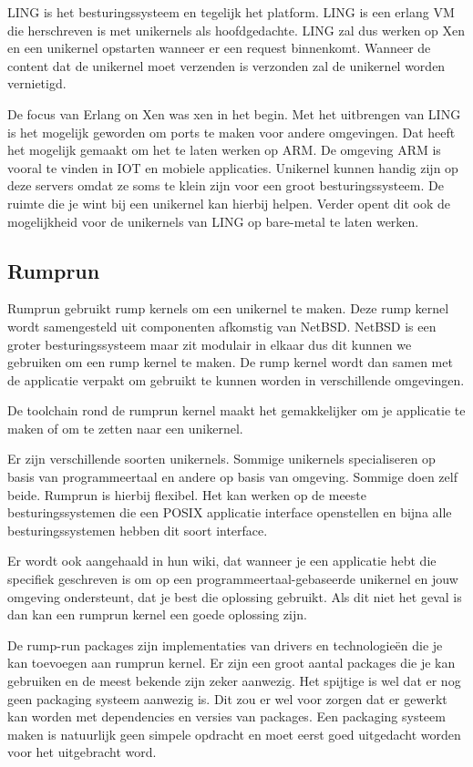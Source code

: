 \documentclass[pdftex,a4paper,12pt,twoside]{report}
\begin{document}
LING is het besturingssysteem en tegelijk het platform. LING is een erlang VM die herschreven is met unikernels als hoofdgedachte. LING zal dus werken op Xen en een unikernel opstarten wanneer er een request binnenkomt. Wanneer de content dat de unikernel moet verzenden is verzonden zal de unikernel worden vernietigd. 

De focus van Erlang on Xen was xen in het begin. Met het uitbrengen van LING is het mogelijk geworden om ports te maken voor andere omgevingen. Dat heeft het mogelijk gemaakt om het te laten werken op ARM. De omgeving ARM is vooral te vinden in IOT en mobiele applicaties. Unikernel kunnen handig zijn op deze servers omdat ze soms te klein zijn voor een groot besturingssysteem. De ruimte die je wint bij een unikernel kan hierbij helpen. Verder opent dit ook de mogelijkheid voor de unikernels van LING op bare-metal te laten werken.

\subsection{Rumprun}

Rumprun gebruikt rump kernels om een unikernel te maken. Deze rump kernel wordt samengesteld uit componenten afkomstig van NetBSD. NetBSD is een groter besturingssysteem maar zit modulair in elkaar dus dit kunnen we gebruiken om een rump kernel te maken. De rump kernel wordt dan samen met de applicatie verpakt om gebruikt te kunnen worden in verschillende omgevingen.

De toolchain rond de rumprun kernel maakt het gemakkelijker om je applicatie te maken of om te zetten naar een unikernel. 

Er zijn verschillende soorten unikernels. Sommige unikernels specialiseren op basis van programmeertaal en andere op basis van omgeving. Sommige doen zelf beide. Rumprun is hierbij flexibel. Het kan werken op de meeste besturingssystemen die een POSIX applicatie interface openstellen en bijna alle besturingssystemen hebben dit soort interface.

Er wordt ook aangehaald in hun wiki, dat wanneer je een applicatie hebt die specifiek geschreven is om op een programmeertaal-gebaseerde unikernel en jouw omgeving ondersteunt, dat je best die oplossing gebruikt. Als dit niet het geval is dan kan een rumprun kernel een goede oplossing zijn.

De rump-run packages zijn implementaties van drivers en technologieën  die je kan toevoegen aan rumprun kernel. Er zijn een groot aantal packages die je kan gebruiken en de meest bekende zijn zeker aanwezig. Het spijtige is wel dat er nog geen packaging systeem aanwezig is. Dit zou er wel voor zorgen dat er gewerkt kan worden met dependencies en versies van packages. Een packaging systeem maken is natuurlijk geen simpele opdracht en moet eerst goed uitgedacht worden voor het uitgebracht word.
\end{document}
